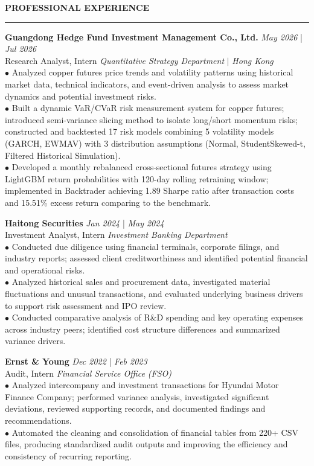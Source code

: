 \documentclass{resume} %
\renewcommand{\sectionskip}{\vspace{0.10cm}}        %
\renewcommand{\sectionlineskip}{\vspace{0.10cm}}
\renewenvironment{rSection}[1]{
\sectionskip
\textcolor{UC San Diego Blue}{\textbf{\large\bfseries\MakeUppercase{#1}}}

\sectionlineskip
\hrule
\begin{list}{}{
\setlength{\leftmargin}{0em}
}
\item[]
}{
\end{list}
}
\begin{document}
\begin{rSection}{PROFESSIONAL EXPERIENCE}
\noindent
\textbf{Guangdong Hedge Fund Investment Management Co., Ltd.} \hfill {\em May 2026} | {\em Jul 2026} \\
Research Analyst, Intern \hfill \textit{Quantitative Strategy Department} $|$ \textit{Hong Kong} \\[4pt]
$\bullet$ Analyzed copper futures price trends and volatility patterns using historical market data, technical indicators, and event-driven analysis to assess market dynamics and potential investment risks.\\[1.5pt]    
$\bullet$ Built a dynamic VaR/CVaR risk measurement system for copper futures; introduced semi-variance slicing method to isolate long/short momentum risks; constructed and backtested 17 risk models combining 5 volatility models (GARCH, EWMAV) with 3 distribution assumptions (Normal, Student\/Skewed-t, Filtered Historical Simulation).\\[1.5pt]
$\bullet$ Developed a monthly rebalanced cross-sectional futures strategy using LightGBM return probabilities with 120-day rolling retraining window; implemented in Backtrader achieving 1.89 Sharpe ratio after transaction costs and 15.51\% excess return comparing to the benchmark.

\textbf{Haitong Securities} \hfill {\em Jan 2024} | {\em May 2024} \\
Investment Analyst, Intern \hfill \textit{Investment Banking Department} \\[4pt]
$\bullet$ Conducted due diligence using financial terminals, corporate filings, and industry reports; assessed client creditworthiness and identified potential financial and operational risks.\\[1.5pt]
$\bullet$ Analyzed historical sales and procurement data, investigated material fluctuations and unusual transactions, and evaluated underlying business drivers to support risk assessment and IPO review. \\[1.5pt]
$\bullet$ Conducted comparative analysis of R\&D spending and key operating expenses across industry peers; identified cost structure differences and summarized variance drivers.

\textbf{Ernst \& Young} \hfill {\em Dec 2022} | {\em Feb 2023} \\
Audit, Intern \hfill \textit{Financial Service Office (FSO)} \\[4pt]
$\bullet$ Analyzed intercompany and investment transactions for Hyundai Motor Finance Company; performed variance analysis, investigated significant deviations, reviewed supporting records, and documented findings and recommendations.\\[1.5pt]
$\bullet$ Automated the cleaning and consolidation of financial tables from 220+ CSV files, producing standardized audit outputs and improving the efficiency and consistency of recurring reporting.

\end{rSection}
\end{document}
